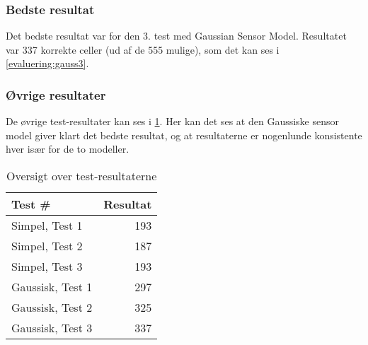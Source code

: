 \subsubsection*{Bedste resultat}
Det bedste resultat var for den 3. test med Gaussian Sensor Model.
Resultatet var 337 korrekte celler (ud af de 555 mulige), som det kan ses i \cref{evaluering:gauss3}.

\subsubsection*{Øvrige resultater}
De øvrige test-resultater kan ses i \cref{evaluering:testresultater}.
Her kan det ses at den Gaussiske sensor model giver klart det bedste resultat, og at resultaterne er nogenlunde konsistente hver især for de to modeller.

\begin{table}[h]
\centering
\begin{tabular}{|l|r|}
\hline
\textbf{Test \#} & \textbf{Resultat} \\ \hline \hline
Simpel, Test 1 & 193 \\ \hline
Simpel, Test 2 & 187 \\ \hline
Simpel, Test 3 & 193 \\ \hline \hline
Gaussisk, Test 1 & 297 \\ \hline
Gaussisk, Test 2 & 325 \\ \hline
Gaussisk, Test 3 & 337 \\ \hline
\end{tabular}
\caption{Oversigt over test-resultaterne}
\label{evaluering:testresultater}
\end{table}
